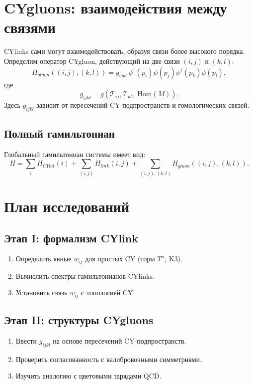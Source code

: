 \documentclass[12pt,a4paper]{article}
\begin{document}
\section{CYgluons: взаимодействия между связями}
CYlinks сами могут взаимодействовать, образуя связи более высокого порядка.  
Определим оператор CYgluon, действующий на две связи $(i,j)$ и $(k,l)$:
\begin{equation}
H_{gluon}((i,j),(k,l)) = g_{ijkl} \, \psi^\dagger(p_i)\psi(p_j)\psi^\dagger(p_k)\psi(p_l),
\end{equation}
где
\begin{equation}
g_{ijkl} = g(\mathcal{T}_{ij}, \mathcal{T}_{kl}, \; \mathrm{Hom}(M)).
\end{equation}
Здесь $g_{ijkl}$ зависит от пересечений CY-подпространств и гомологических связей.  

\subsection{Полный гамильтониан}
Глобальный гамильтониан системы имеет вид:
\begin{equation}
H = \sum_i H_{CYbit}(i) + \sum_{(i,j)} H_{link}(i,j) + \sum_{(i,j),(k,l)} H_{gluon}((i,j),(k,l)).
\end{equation}

\section{План исследований}
\subsection{Этап I: формализм CYlink}
\begin{enumerate}
\item Определить явные $w_{ij}$ для простых CY (торы $T^n$, K3).  
\item Вычислить спектры гамильтонианов CYlinks.  
\item Установить связь $w_{ij}$ с топологией CY.  
\end{enumerate}

\subsection{Этап II: структуры CYgluons}
\begin{enumerate}
\item Ввести $g_{ijkl}$ на основе пересечений CY-подпространств.  
\item Проверить согласованность с калибровочными симметриями.  
\item Изучить аналогию с цветовыми зарядами QCD.  
\end{enumerate}
\end{document}

